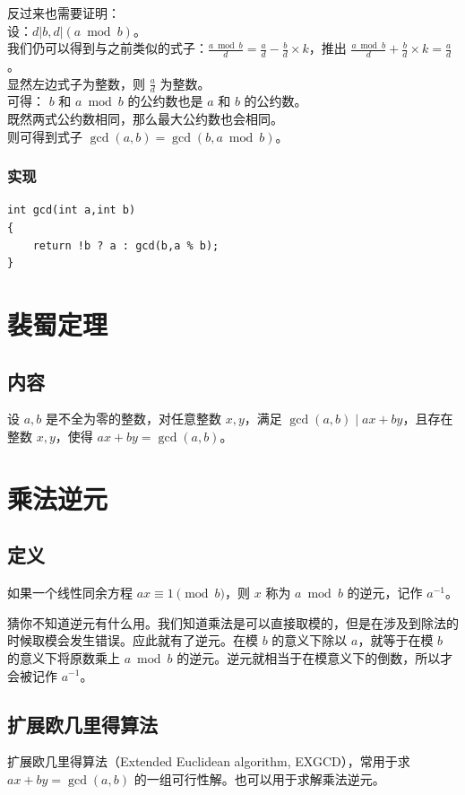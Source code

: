 \documentclass[10pt,twoside,a4paper,UTF8]{ctexbook}
\begin{document}
	\noindent
	反过来也需要证明：\\
	设：$d | b,d | (a \bmod b)$。\\
	我们仍可以得到与之前类似的式子：$\frac{a \bmod b}{d} = \frac{a}{d} - \frac{b}{d} \times k$，推出 $\frac{a \bmod b}{d} + \frac{b}{d} \times k = \frac{a}{d}$。\\
	显然左边式子为整数，则 $\frac{a}{d}$ 为整数。\\
	可得： $b$ 和 $a \bmod b$ 的公约数也是 $a$ 和 $b$ 的公约数。\\
	
	\noindent
	既然两式公约数相同，那么最大公约数也会相同。\\
	则可得到式子 $\gcd(a,b) = \gcd(b,a\bmod b)$。
	
	\subsubsection{实现}
	\begin{lstlisting}
int gcd(int a,int b)
{
	return !b ? a : gcd(b,a % b);
}
	\end{lstlisting}
	
	\section{裴蜀定理}
	\subsection{内容}
	设 $a,b$ 是不全为零的整数，对任意整数 $x,y$，满足 $\gcd(a,b)\mid ax+by$，且存在整数 $x,y$，使得 $ax+by=\gcd(a,b)$。
	\section{乘法逆元}
	\subsection{定义}
	如果一个线性同余方程 $ax \equiv 1 \pmod b$，则 $x$ 称为 $a \bmod b$ 的逆元，记作 $a^{-1}$。\par
	猜你不知道逆元有什么用。我们知道乘法是可以直接取模的，但是在涉及到除法的时候取模会发生错误。应此就有了逆元。在模 $b$ 的意义下除以 $a$，就等于在模 $b$ 的意义下将原数乘上 $a\bmod b$ 的逆元。逆元就相当于在模意义下的倒数，所以才会被记作 $a^{-1}$。
	\subsection{扩展欧几里得算法}
	扩展欧几里得算法（Extended Euclidean algorithm, EXGCD），常用于求 $ax+by=\gcd(a,b)$ 的一组可行性解。也可以用于求解乘法逆元。
\end{document}
